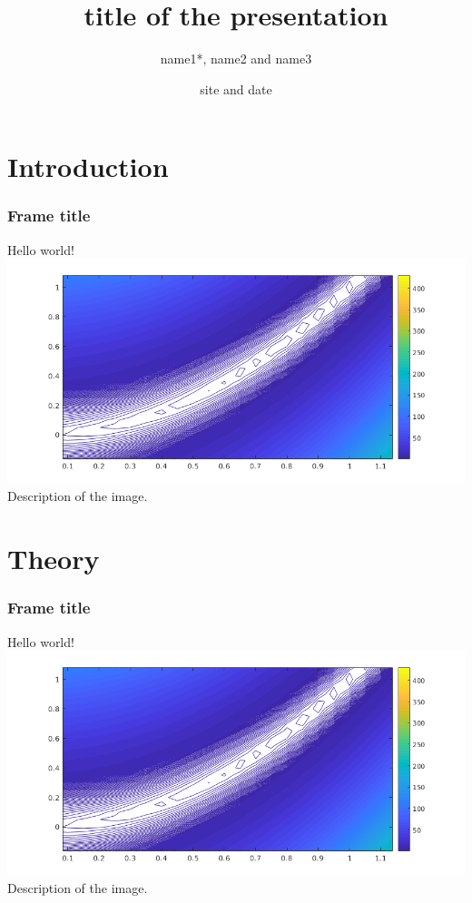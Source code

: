 \documentclass[aspectratio=169]{beamer}
\title{title of the presentation​​}
\author[name1, name2, name3]{name1*, name2 and name3}
\date[site]{site and date}
\begin{document}
\begin{frame}
 \titlepage 
\end{frame}


\section{Introduction}
\begin{frame}
 \frametitle{Frame title}
 Hello world!\\
 \includegraphics[scale=0.5]{images/rosenbrockzoom.png}\\
 Description of the image.
\end{frame}

\section{Theory}
\begin{frame}
 \frametitle{Frame title}
 Hello world!\\
 \includegraphics[scale=0.5]{images/rosenbrockzoom.png}\\
 Description of the image.
\end{frame}
\end{document}
